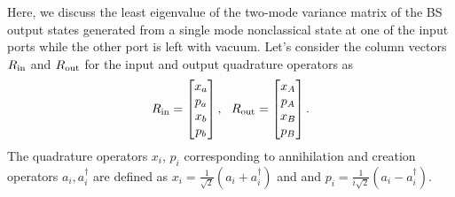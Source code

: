 \documentclass[letter,scriptaddress,twocolumn, prl,showkeys]{revtex4}
\begin{document}
Here, we discuss the least eigenvalue of the two-mode variance matrix of the BS output states generated from a single mode nonclassical state at one of the input ports while the other port is left with vacuum. Let's consider the column vectors $R_{\rm{in}}$ and $R_{\rm{out}}$ for the input and output quadrature operators as
\begin{equation}
R_{\rm{in}}=\begin{bmatrix}
x_{a} \\
p_{a} \\
x_{b} \\
p_{b} \\
\end{bmatrix},~~
R_{\rm{out}}=\begin{bmatrix}
x_{A} \\
p_{A} \\
x_{B} \\
p_{B} \\
\end{bmatrix} .
\end{equation} 
The quadrature operators $x_{i}$, $p_{i}$ corresponding to annihilation and creation
operators $a_{i}, a^{\dagger}_{i}$ are defined as $x_{i}=\frac{1}{\sqrt{2}}(a_{i}+a^{\dagger}_{i})$ and 
and $p_{i}=\frac{1}{i\sqrt{2}}(a_{i}-a^{\dagger}_{i})$.
\end{document}
